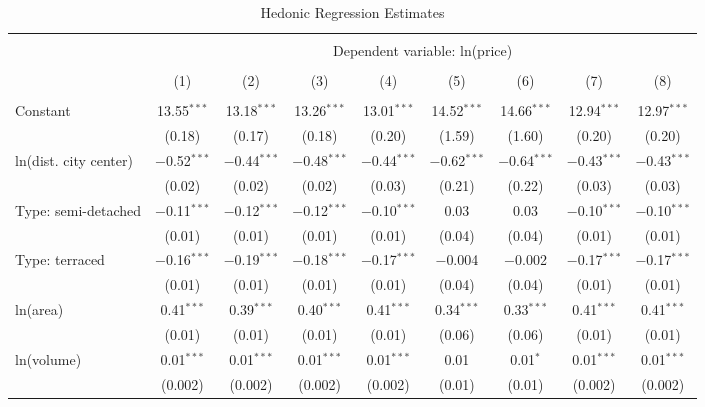 
\begin{table}[!htbp] \centering 
  \caption{Hedonic Regression Estimates} 
  \label{tab:hedreg} 
\footnotesize 
\begin{tabular}{@{\extracolsep{5pt}}lcccccccc} 
\\[-1.8ex]\hline 
\hline \\[-1.8ex] 
 & \multicolumn{8}{c}{Dependent variable: ln(price)} \\ 
\cline{2-9} 
\\[-1.8ex] & (1) & (2) & (3) & (4) & (5) & (6) & (7) & (8)\\ 
\hline \\[-1.8ex] 
 Constant & 13.55$^{***}$ & 13.18$^{***}$ & 13.26$^{***}$ & 13.01$^{***}$ & 14.52$^{***}$ & 14.66$^{***}$ & 12.94$^{***}$ & 12.97$^{***}$ \\ 
  & (0.18) & (0.17) & (0.18) & (0.20) & (1.59) & (1.60) & (0.20) & (0.20) \\ 
  ln(dist. city center) & $-$0.52$^{***}$ & $-$0.44$^{***}$ & $-$0.48$^{***}$ & $-$0.44$^{***}$ & $-$0.62$^{***}$ & $-$0.64$^{***}$ & $-$0.43$^{***}$ & $-$0.43$^{***}$ \\ 
  & (0.02) & (0.02) & (0.02) & (0.03) & (0.21) & (0.22) & (0.03) & (0.03) \\ 
  Type: semi-detached & $-$0.11$^{***}$ & $-$0.12$^{***}$ & $-$0.12$^{***}$ & $-$0.10$^{***}$ & 0.03 & 0.03 & $-$0.10$^{***}$ & $-$0.10$^{***}$ \\ 
  & (0.01) & (0.01) & (0.01) & (0.01) & (0.04) & (0.04) & (0.01) & (0.01) \\ 
  Type: terraced & $-$0.16$^{***}$ & $-$0.19$^{***}$ & $-$0.18$^{***}$ & $-$0.17$^{***}$ & $-$0.004 & $-$0.002 & $-$0.17$^{***}$ & $-$0.17$^{***}$ \\ 
  & (0.01) & (0.01) & (0.01) & (0.01) & (0.04) & (0.04) & (0.01) & (0.01) \\ 
  ln(area) & 0.41$^{***}$ & 0.39$^{***}$ & 0.40$^{***}$ & 0.41$^{***}$ & 0.34$^{***}$ & 0.33$^{***}$ & 0.41$^{***}$ & 0.41$^{***}$ \\ 
  & (0.01) & (0.01) & (0.01) & (0.01) & (0.06) & (0.06) & (0.01) & (0.01) \\ 
  ln(volume) & 0.01$^{***}$ & 0.01$^{***}$ & 0.01$^{***}$ & 0.01$^{***}$ & 0.01 & 0.01$^{*}$ & 0.01$^{***}$ & 0.01$^{***}$ \\ 
  & (0.002) & (0.002) & (0.002) & (0.002) & (0.01) & (0.01) & (0.002) & (0.002) \\ 

\end{tabular}
\end{table}

